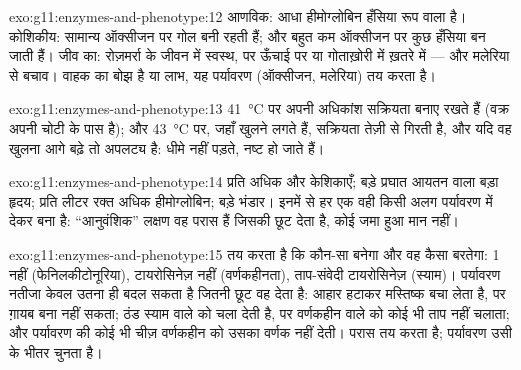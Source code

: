 \begin{solution}{exo:g11:enzymes-and-phenotype:12}
आणविक: आधा हीमोग्लोबिन हँसिया रूप वाला है। कोशिकीय: सामान्य ऑक्सीजन पर
 गोल बनी रहती हैं; और बहुत कम ऑक्सीजन पर कुछ हँसिया बन जाती हैं।
जीव का: रोज़मर्रा के जीवन में स्वस्थ, पर ऊँचाई पर या गोताख़ोरी में ख़तरे
में --- और मलेरिया से बचाव। वाहक का  बोझ है या लाभ, यह
पर्यावरण (ऑक्सीजन, मलेरिया) तय करता है।
\end{solution}

\begin{solution}{exo:g11:enzymes-and-phenotype:13}
\qty{41}{\celsius} पर  अपनी अधिकांश सक्रियता बनाए रखते हैं (वक्र
अपनी चोटी के पास है); और \qty{43}{\celsius} पर, जहाँ  खुलने लगते
हैं, सक्रियता तेज़ी से गिरती है, और यदि वह खुलना आगे बढ़े तो अपलट्य है:
 धीमे नहीं पड़ते, नष्ट हो जाते हैं।
\end{solution}

\begin{solution}{exo:g11:enzymes-and-phenotype:14}
प्रति  अधिक  और केशिकाएँ; बड़े प्रघात आयतन वाला बड़ा
हृदय; प्रति लीटर रक्त अधिक हीमोग्लोबिन; बड़े  भंडार। इनमें से हर
एक वही  किसी अलग पर्यावरण में देकर बना  है:
``आनुवंशिक'' लक्षण वह परास हैं जिसकी छूट  देता है, कोई जमा हुआ मान
नहीं।
\end{solution}

\begin{solution}{exo:g11:enzymes-and-phenotype:15}
 तय करता है कि कौन-सा  बनेगा और वह कैसा बरतेगा:  1
नहीं (फेनिलकीटोनूरिया), टायरोसिनेज़ नहीं (वर्णकहीनता), ताप-संवेदी
टायरोसिनेज़ (स्याम)। पर्यावरण नतीजा केवल उतना ही बदल सकता है जितनी छूट वह
 देता है: आहार  हटाकर मस्तिष्क बचा लेता है, पर ग़ायब 
बना नहीं सकता; ठंड स्याम वाले  को चला देती है, पर वर्णकहीन वाले को
कोई भी ताप नहीं चलाता; और पर्यावरण की कोई भी चीज़ वर्णकहीन को उसका वर्णक
नहीं देती।  परास तय करता है; पर्यावरण उसी के भीतर चुनता है।
\end{solution}

